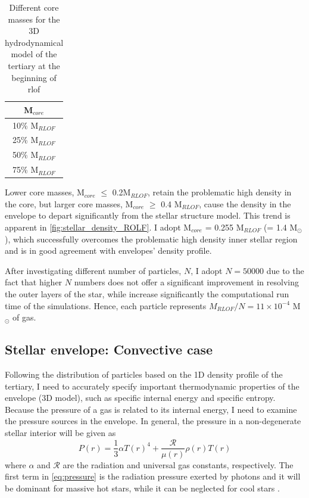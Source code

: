 \begin{table}[H]
    \centering
    \begin{tabular}{| c |}
       M$_{core}$  \\
       \hline
       10\% M$_{RLOF}$\\
       25\% M$_{RLOF}$\\
       50\% M$_{RLOF}$\\
       75\% M$_{RLOF}$
    \end{tabular}
    \caption{ Different core masses for the 3D hydrodynamical model of the tertiary at the beginning of \ac{rlof}}
    \label{tab:core_masses_ROLF}
\end{table}
Lower core masses, M$_{core}$ $\leq$ 0.2M$_{RLOF}$, retain the problematic high density in the core, but larger core masses, M$_{core}$ $\geq$ 0.4 M$_{RLOF}$, cause the density in the envelope to depart significantly from the stellar structure model. This trend is apparent in \cref{fig:stellar_density_ROLF}. I adopt M$_{core}$ = 0.255 M$_{RLOF}$ (= 1.4 M$_{\odot}$), which successfully overcomes the problematic high density inner stellar region and is in good agreement with envelopes' density profile.

After investigating different number of particles, $N$, I adopt $N=50000$  due to the fact that higher $N$ numbers does not offer a significant improvement in resolving the outer layers of the star, while increase significantly the computational run time of the simulations.  Hence, each particle represents $M_{RLOF}/N = 11 \times 10^{-4}$ M$_{\odot}$ of gas.

\subsection{Stellar envelope: Convective case}\label{sub:envelope_conv}

Following the distribution of particles based on the 1D density profile of the tertiary, I need to accurately specify important thermodynamic properties of the envelope (3D model), such as specific internal energy and specific entropy. Because the pressure of a gas is related to its internal energy, I need to examine the pressure sources in the envelope. In general, the pressure in a non-degenerate stellar interior will be given as 
\begin{equation}\label{eq:pressure}
    P(r) = \frac{1}{3} \alpha T(r)^4+ \frac{\mathcal{R}}{\mu(r)} \rho(r) T(r)
\end{equation}
where $\alpha$ and $\mathcal{R}$ are the radiation and universal gas constants, respectively. The first term in \cref{eq:pressure} is the radiation pressure exerted by photons and it will be dominant for massive hot stars, while it can be neglected for cool stars \citep{pols2011stellar}.

